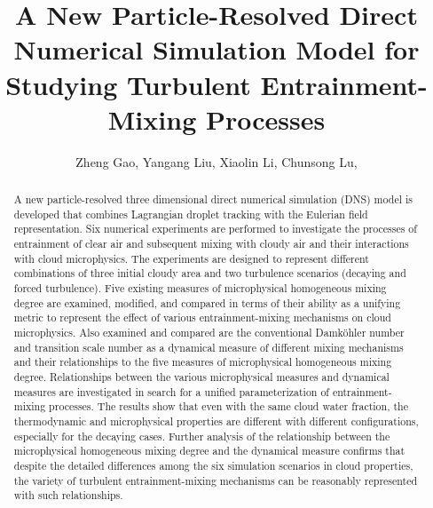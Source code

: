 \documentclass[draft,jgrga]{AGUTeX}
\begin{document}
\title{A New Particle-Resolved Direct Numerical Simulation Model for Studying Turbulent Entrainment-Mixing Processes}
\author{Zheng Gao,
Yangang Liu,
Xiaolin Li,
Chunsong Lu,}


\begin{abstract}
A new particle-resolved three dimensional direct numerical simulation (DNS) model is developed that combines Lagrangian droplet tracking with the Eulerian field representation. Six numerical experiments are performed to investigate the processes of entrainment of clear air and subsequent mixing with cloudy air and their interactions with cloud microphysics. The experiments are designed to represent different combinations of three initial cloudy area and two turbulence scenarios (decaying and forced turbulence). Five existing measures of microphysical homogeneous mixing degree are examined, modified, and compared in terms of their ability as a unifying metric to represent the effect of various entrainment-mixing mechanisms on cloud microphysics. Also examined and compared are the conventional Damk\"ohler number and transition scale number as a dynamical measure of different mixing mechanisms and their relationships to the five measures of microphysical homogeneous mixing degree. Relationships between the various microphysical measures and dynamical measures are investigated in search for a unified parameterization of entrainment-mixing processes. The results show that even with the same cloud water fraction, the thermodynamic and microphysical properties are different with different configurations, especially for the decaying cases. Further analysis of the relationship between the microphysical homogeneous mixing degree and the dynamical measure confirms that despite the detailed differences among the six simulation scenarios in cloud properties, the variety of turbulent entrainment-mixing mechanisms can be reasonably represented with such relationships.    
\end{abstract}
\end{document}

